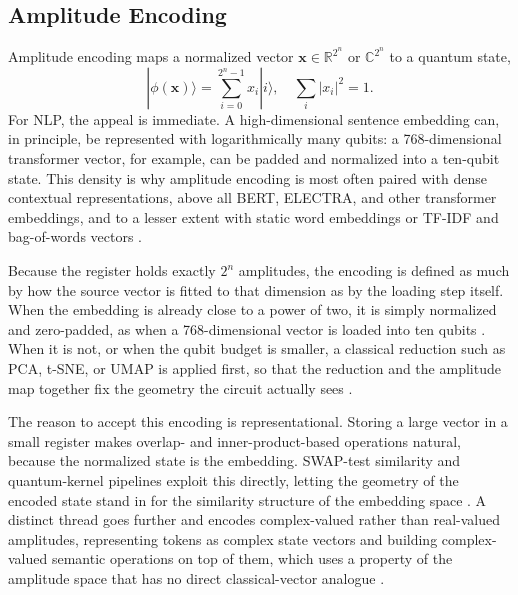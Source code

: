 \documentclass{ieeeaccess}
\begin{document}
\subsection{Amplitude Encoding}
\label{subsec:amplitude_encoding}

Amplitude encoding maps a normalized vector $\mathbf{x} \in \mathbb{R}^{2^n}$ or $\mathbb{C}^{2^n}$ to a quantum state,
\begin{equation}
|\phi(\mathbf{x})\rangle = \sum_{i=0}^{2^n-1} x_i |i\rangle,
\quad \sum_i |x_i|^2 = 1.
\end{equation}
For NLP, the appeal is immediate. A high-dimensional sentence embedding can, in principle, be represented with logarithmically many qubits: a 768-dimensional transformer vector, for example, can be padded and normalized into a ten-qubit state. This density is why amplitude encoding is most often paired with dense contextual representations, above all BERT, ELECTRA, and other transformer embeddings, and to a lesser extent with static word embeddings or TF-IDF and bag-of-words vectors \cite{buonaiuto_quantum_2024,guarasci_applying_2025,cavar_old_2026,zeguendry_quantum_2024}.

Because the register holds exactly $2^n$ amplitudes, the encoding is defined as much by how the source vector is fitted to that dimension as by the loading step itself. When the embedding is already close to a power of two, it is simply normalized and zero-padded, as when a 768-dimensional vector is loaded into ten qubits \cite{guarasci_applying_2025,buonaiuto_multilingual_2025}. When it is not, or when the qubit budget is smaller, a classical reduction such as PCA, t-SNE, or UMAP is applied first, so that the reduction and the amplitude map together fix the geometry the circuit actually sees \cite{korrapati_quantum_2025,zhang_entangled_2024,tufchi_quantum-enhanced_2026}.

The reason to accept this encoding is representational. Storing a large vector in a small register makes overlap- and inner-product-based operations natural, because the normalized state is the embedding. SWAP-test similarity and quantum-kernel pipelines exploit this directly, letting the geometry of the encoded state stand in for the similarity structure of the embedding space \cite{cavar_word_2025,zeguendry_quantum_2024,schuld2019quantum}. A distinct thread goes further and encodes complex-valued rather than real-valued amplitudes, representing tokens as complex state vectors and building complex-valued semantic operations on top of them, which uses a property of the amplitude space that has no direct classical-vector analogue \cite{routh_quantum_2026,cavar_old_2026}.
\end{document}
